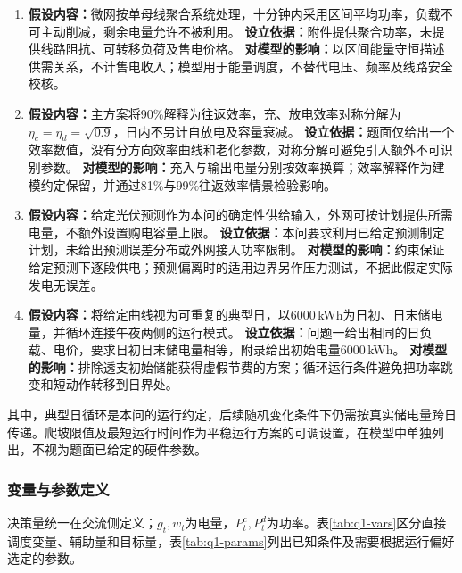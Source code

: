 \documentclass[withoutpreface,bwprint]{cumcmthesis}
\begin{document}
\begin{enumerate}[label=\textbf{假设\arabic*：},leftmargin=4.8em,itemsep=5pt]
 \item \textbf{假设内容：}微网按单母线聚合系统处理，十分钟内采用区间平均功率，负载不可主动削减，剩余电量允许不被利用。
 \textbf{设立依据：}附件提供聚合功率，未提供线路阻抗、可转移负荷及售电价格。
 \textbf{对模型的影响：}以区间能量守恒描述供需关系，不计售电收入；模型用于能量调度，不替代电压、频率及线路安全校核。

 \item \textbf{假设内容：}主方案将90\%解释为往返效率，充、放电效率对称分解为$\eta_c=\eta_d=\sqrt{0.9}$，日内不另计自放电及容量衰减。
 \textbf{设立依据：}题面仅给出一个效率数值，没有分方向效率曲线和老化参数，对称分解可避免引入额外不可识别参数。
 \textbf{对模型的影响：}充入与输出电量分别按效率换算；效率解释作为建模约定保留，并通过81\%与99\%往返效率情景检验影响。

 \item \textbf{假设内容：}给定光伏预测作为本问的确定性供给输入，外网可按计划提供所需电量，不额外设置购电容量上限。
 \textbf{设立依据：}本问要求利用已给定预测制定计划，未给出预测误差分布或外网接入功率限制。
 \textbf{对模型的影响：}约束保证给定预测下逐段供电；预测偏离时的适用边界另作压力测试，不据此假定实际发电无误差。

 \item \textbf{假设内容：}将给定曲线视为可重复的典型日，以6000\,kWh为日初、日末储电量，并循环连接午夜两侧的运行模式。
 \textbf{设立依据：}问题一给出相同的日负载、电价，要求日初日末储电量相等，附录给出初始电量6000\,kWh。
 \textbf{对模型的影响：}排除透支初始储能获得虚假节费的方案；循环运行条件避免把功率跳变和短动作转移到日界处。
\end{enumerate}
其中，典型日循环是本问的运行约定，后续随机变化条件下仍需按真实储电量跨日传递。爬坡限值及最短运行时间作为平稳运行方案的可调设置，在模型中单独列出，不视为题面已给定的硬件参数。

\subsubsection{变量与参数定义}
决策量统一在交流侧定义；$g_t,w_t$为电量，$P_t^c,P_t^d$为功率。表\ref{tab:q1-vars}区分直接调度变量、辅助量和目标量，表\ref{tab:q1-params}列出已知条件及需要根据运行偏好选定的参数。
\end{document}
